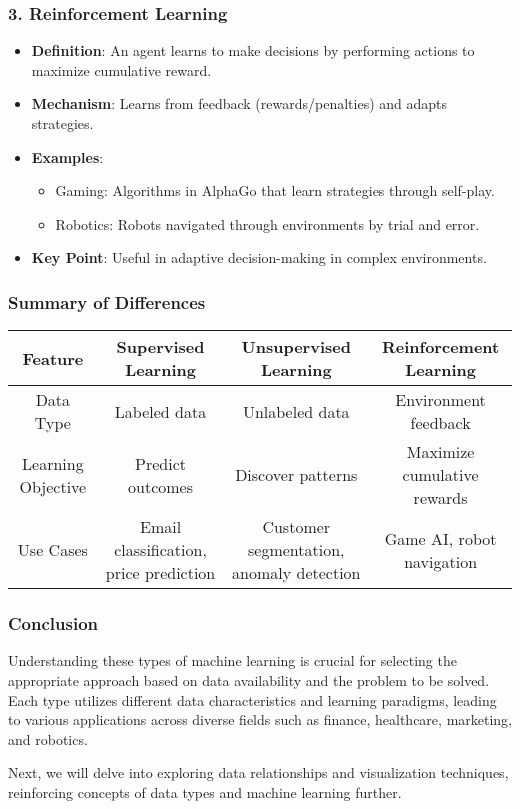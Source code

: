 \documentclass[aspectratio=169]{beamer}
\begin{document}
\begin{frame}[fragile]
    \frametitle{3. Reinforcement Learning}
    \begin{itemize}
        \item \textbf{Definition}: An agent learns to make decisions by performing actions to maximize cumulative reward.
        \item \textbf{Mechanism}: Learns from feedback (rewards/penalties) and adapts strategies.
        \item \textbf{Examples}:
        \begin{itemize}
            \item Gaming: Algorithms in AlphaGo that learn strategies through self-play.
            \item Robotics: Robots navigated through environments by trial and error.
        \end{itemize}
        \item \textbf{Key Point}: Useful in adaptive decision-making in complex environments.
    \end{itemize}
\end{frame}

\begin{frame}[fragile]
    \frametitle{Summary of Differences}
    \begin{table}[h!]
        \centering
        \begin{tabular}{|c|c|c|c|}
            \hline
            \textbf{Feature} & \textbf{Supervised Learning} & \textbf{Unsupervised Learning} & \textbf{Reinforcement Learning} \\
            \hline
            Data Type & Labeled data & Unlabeled data & Environment feedback \\
            \hline
            Learning Objective & Predict outcomes & Discover patterns & Maximize cumulative rewards \\
            \hline
            Use Cases & Email classification, price prediction & Customer segmentation, anomaly detection & Game AI, robot navigation \\
            \hline
        \end{tabular}
    \end{table}
\end{frame}

\begin{frame}[fragile]
    \frametitle{Conclusion}
    Understanding these types of machine learning is crucial for selecting the appropriate approach based on data availability and the problem to be solved. Each type utilizes different data characteristics and learning paradigms, leading to various applications across diverse fields such as finance, healthcare, marketing, and robotics. 

    Next, we will delve into exploring data relationships and visualization techniques, reinforcing concepts of data types and machine learning further.
\end{frame}
\end{document}
